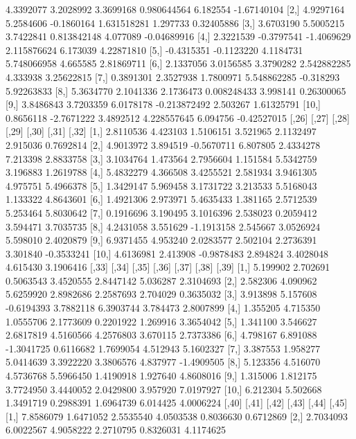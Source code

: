 \documentclass[12pt]{article}
\begin{document}
\begin{Schunk}
\begin{Soutput}
 [1,]  4.3392077  3.2028992  3.3699168  0.980644564  6.182554 -1.67140104
 [2,]  4.9297164  5.2584606 -0.1860164  1.631518281  1.297733  0.32405886
 [3,]  3.6703190  5.5005215  3.7422841  0.813842148  4.077089 -0.04689916
 [4,]  2.3221539 -0.3797541 -1.4069629  2.115876624  6.173039  4.22871810
 [5,] -0.4315351 -0.1123220  4.1184731  5.748066958  4.665585  2.81869711
 [6,]  2.1337056  3.0156585  3.3790282  2.542882285  4.333938  3.25622815
 [7,]  0.3891301  2.3527938  1.7800971  5.548862285 -0.318293  5.92263833
 [8,]  5.3634770  2.1041336  2.1736473  0.008248433  3.998141  0.26300065
 [9,]  3.8486843  3.7203359  6.0178178 -0.213872492  2.503267  1.61325791
[10,]  0.8656118 -2.7671222  3.4892512  4.228557645  6.094756 -0.42527015
          [,26]    [,27]      [,28]    [,29]     [,30]    [,31]      [,32]
 [1,] 2.8110536 4.423103  1.5106151 3.521965 2.1132497 2.915036  0.7692814
 [2,] 4.9013972 3.894519 -0.5670711 6.807805 2.4334278 7.213398  2.8833758
 [3,] 3.1034764 1.473564  2.7956604 1.151584 5.5342759 3.196883  1.2619788
 [4,] 5.4832279 4.366508  3.4255521 2.581934 3.9461305 4.975751  5.4966378
 [5,] 1.3429147 5.969458  3.1731722 3.213533 5.5168043 1.133322  4.8643601
 [6,] 1.4921306 2.973971  5.4635433 1.381165 2.5712539 5.253464  5.8030642
 [7,] 0.1916696 3.190495  3.1016396 2.538023 0.2059412 3.594471  3.7035735
 [8,] 4.2431058 3.551629 -1.1913158 2.545667 3.0526924 5.598010  2.4020879
 [9,] 6.9371455 4.953240  2.0283577 2.502104 2.2736391 3.301840 -0.3533241
[10,] 4.6136981 2.413908 -0.9878483 2.894824 3.4028048 4.615430  3.1906416
         [,33]    [,34]      [,35]     [,36]     [,37]    [,38]      [,39]
 [1,] 5.199902 2.702691  0.5063543 3.4520555 2.8447142 5.036287  2.3104693
 [2,] 2.582306 4.090962  5.6259920 2.8982686 2.2587693 2.704029  0.3635032
 [3,] 3.913898 5.157608 -0.6194393 3.7882118 6.3903744 3.784473  2.8007899
 [4,] 1.355205 4.715350  1.0555706 2.1773609 0.2201922 1.269916  3.3654042
 [5,] 1.341100 3.546627  2.6817819 4.5160566 4.2576803 3.670115  2.7373386
 [6,] 4.798167 6.891088 -1.3041725 0.6116682 1.7699054 4.512943  5.1602327
 [7,] 3.387553 1.958277  5.0414639 3.3922220 3.3806576 4.837977 -1.4909505
 [8,] 5.123356 4.516070  4.5736768 5.5966450 1.4190918 1.927640  4.8608016
 [9,] 1.315006 1.812175  3.7724950 3.4440052 2.0429800 3.957920  7.0197927
[10,] 6.212304 5.502668  1.3491719 0.2988391 1.6964739 6.014425  4.0006224
           [,40]      [,41]      [,42]     [,43]      [,44]      [,45]
 [1,]  7.8586079  1.6471052  2.5535540 4.0503538  0.8036630  0.6712869
 [2,]  2.7034093  6.0022567  4.9058222 2.2710795  0.8326031  4.1174625

\end{Soutput}
\end{Schunk}
\end{document}
